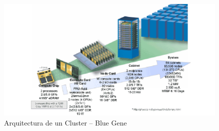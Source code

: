\begin{frame}
 \begin{figure}[ht]
        \centering
        \includegraphics[scale=0.35]{imgs/bluegenearch}
        \caption{Arquitectura de un Cluster -- Blue Gene}
 \end{figure}
\end{frame}

